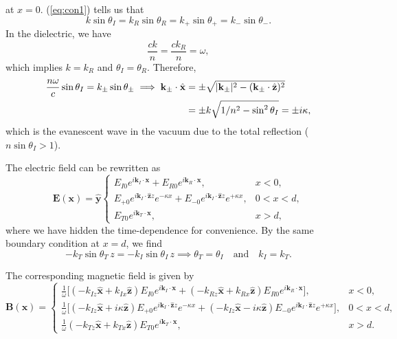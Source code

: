 at $x=0$. (\ref{eq:con1}) tells us that
\begin{equation}
    k\sin\theta_I = k_R\sin\theta_R = k_+\sin\theta_+ = k_-\sin\theta_-.
\end{equation}
In the dielectric, we have
\begin{equation}
    \frac{ck}{n} = \frac{ck_R}{n} = \omega,
\end{equation}
which implies $k=k_R$ and $\theta_I = \theta_R$.
Therefore,
\begin{align}
    \frac{n\omega}{c}\sin\theta_I = k_\pm \sin\theta_\pm  \implies \mathbf{k}_\pm \cdot \hat{\mathbf{x}} &= \pm\sqrt{|\mathbf{k}_\pm|^2 -(\mathbf{k}_\pm \cdot \hat{\mathbf{z}})^2 } \notag\\&=\pm k\sqrt{1/n^2-\sin^2\theta_I} = \pm i\kappa,
\end{align}
which is the evanescent wave in the vacuum due to the total reflection ($n\sin\theta_I >1$).

The electric field can be rewritten as 
\begin{equation}
    \mathbf{E}(\mathbf{x}) = \hat{\mathbf{y}}\begin{cases}
        E_{I0}e^{i\mathbf{k}_I\cdot \mathbf{x} } + E_{R0}e^{i\mathbf{k}_R\cdot {\mathbf{x}} },&x<0,\\
        E_{+0}e^{i\mathbf{k}_I\cdot \hat{\mathbf{z}} z}e^{-\kappa x} + E_{-0}e^{i\mathbf{k}_I\cdot \hat{\mathbf{z}}z }e^{+\kappa x}, &0<x<d,\\
        E_{T0}e^{i\mathbf{k}_T\cdot \mathbf{x}},&   x>d,
    \end{cases}
\end{equation}
where we have hidden the time-dependence for convenience.
By the same boundary condition at $x=d$, we find
\begin{equation}
    - k_T\sin\theta_T \,z= -k_I\sin\theta_I \,z \implies  \theta_T = \theta_I \quad \text{and} \quad k_I = k_T.
\end{equation}

The corresponding magnetic field is given by
\begin{equation}
\mathbf{B}(\mathbf{x}) = \begin{cases}
\frac{1}{\omega}\Big[
(-k_{Iz}\hat{\mathbf x} + k_{Ix}\hat{\mathbf z}) E_{I0} e^{i\mathbf{k}_I\cdot \mathbf{x}}
+
(-k_{Rz}\hat{\mathbf x} + k_{Rx}\hat{\mathbf z}) E_{R0} e^{i\mathbf{k}_R\cdot \mathbf{x}}
\Big], & x<0, \\[6pt]
\frac{1}{\omega}\Big[
(-k_{Iz}\hat{\mathbf x} + i\kappa \hat{\mathbf z}) E_{+0} e^{i\mathbf{k}_I\cdot \hat{\mathbf z} z} e^{-\kappa x}
+
(-k_{Iz}\hat{\mathbf x} - i\kappa \hat{\mathbf z}) E_{-0} e^{i\mathbf{k}_I\cdot \hat{\mathbf z} z} e^{+\kappa x}
\Big], & 0<x<d, \\[6pt]
\frac{1}{\omega}
(-k_{Tz}\hat{\mathbf x} + k_{Tx}\hat{\mathbf z}) E_{T0} e^{i\mathbf{k}_T\cdot \mathbf{x}}, & x>d.
\end{cases}
\end{equation}

